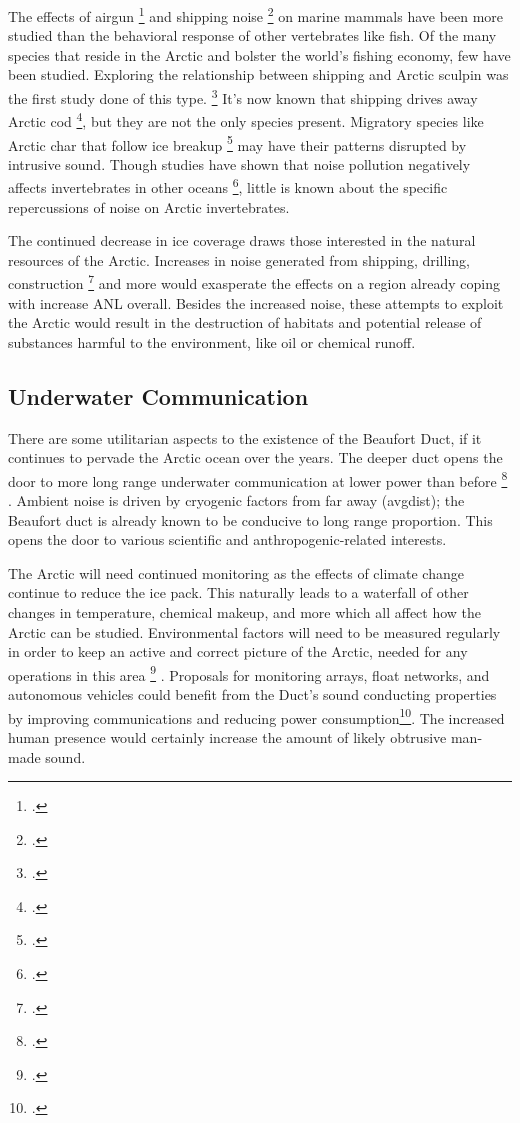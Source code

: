 The effects of airgun \footcite[]{halliday2020potential} and shipping noise \footcite[]{halliday2017potential} on marine mammals have been more studied than the behavioral response of other vertebrates like fish. Of the many species that reside in the Arctic and bolster the world's fishing economy, few have been studied. Exploring the relationship between shipping and Arctic sculpin was the first study done of this type. \footcite[]{ivanova2018sculpin} It's now known that shipping drives away Arctic cod \footcite[]{ivanova2020shipping}, but they are not the only species present. Migratory species like Arctic char that follow ice breakup \footcite[]{hammer2021char} may have their patterns disrupted by intrusive sound. Though studies have shown that noise pollution negatively affects invertebrates in other oceans \footcite[]{difranco2020}, little is known about the specific repercussions of noise on Arctic invertebrates.

The continued decrease in ice coverage draws those interested in the natural resources of the Arctic. Increases in noise generated from shipping, drilling, construction \footcite[]{gering2020aca} and more would exasperate the effects on a region already coping with increase ANL overall. Besides the increased noise, these attempts to exploit the Arctic would result in the destruction of habitats and potential release of substances harmful to the environment, like oil or chemical runoff.


\subsection{Underwater Communication}

There are some utilitarian aspects to the existence of the Beaufort Duct, if it continues to pervade the Arctic ocean over the years. The deeper duct opens the door to more long range underwater communication at lower power than before \footcite[]{freitag2015underwatercomms} . Ambient noise is driven by cryogenic factors from far away (avgdist); the Beaufort duct is already known to be conducive to long range proportion. This opens the door to various scientific and anthropogenic-related interests.

The Arctic will need continued monitoring as the effects of climate change continue to reduce the ice pack. This naturally leads to a waterfall of other changes in temperature, chemical makeup, and more which all affect how the Arctic can be studied. Environmental factors will need to be measured regularly in order to keep an active and correct picture of the Arctic, needed for any operations in this area \footcite[]{Schmidt2016commnav} . Proposals for monitoring arrays, float networks, and autonomous vehicles could benefit from the Duct's sound conducting properties by improving communications and reducing power consumption\footcite[]{kukulya2016development}. The increased human presence would certainly increase the amount of likely obtrusive man-made sound.



